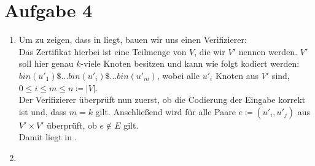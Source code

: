\documentclass[a4paper,11pt]{scrartcl}
\begin{document}
	\section*{Aufgabe 4}
	\begin{enumerate}[label=\alph*)]
	\item	Um zu zeigen, dass  in  liegt, bauen wir uns einen Verifizierer:\\
		Das Zertifikat hierbei ist eine Teilmenge von $V$, die wir $V'$ nennen werden. $V'$ soll hier genau $k$-viele Knoten besitzen und kann wie folgt kodiert werden:\\
		$bin(u'_1)\$...bin(u'_i)\$...bin(u'_m)$, wobei alle $u'_i$ Knoten aus $V'$ sind, $0\leq i \leq m \leq n \coloneqq \vert V \vert$.\\
		Der Verifizierer überprüft nun zuerst, ob die Codierung der Eingabe korrekt ist und, dass $m = k$ gilt. Anschließend wird für alle Paare $e \coloneqq (u'_i, u'_j)$ aus $V' \times V'$ überprüft, ob $e \not\in E$ gilt.\\
	Damit liegt  in \NP.
	
	\item
	\end{enumerate}
	
\end{document}
